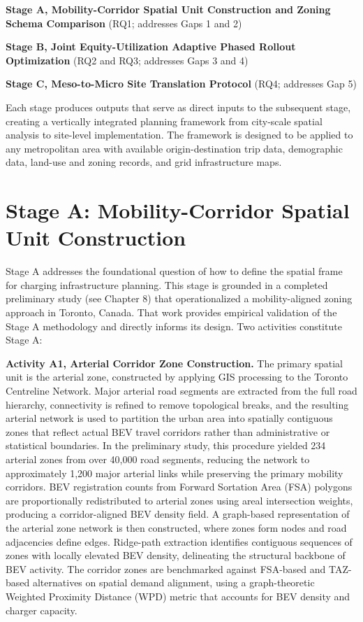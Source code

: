 \documentclass[letterpaper, 12pt, oneside, doublespacing]{Thesis}
\begin{document}
\noindent \textbf{Stage A, Mobility-Corridor Spatial Unit Construction and Zoning Schema Comparison} (RQ1; addresses Gaps 1 and 2)



\noindent \textbf{Stage B, Joint Equity-Utilization Adaptive Phased Rollout Optimization} (RQ2 and RQ3; addresses Gaps 3 and 4)



\noindent \textbf{Stage C, Meso-to-Micro Site Translation Protocol} (RQ4; addresses Gap 5)


Each stage produces outputs that serve as direct inputs to the subsequent stage, creating a vertically integrated planning framework from city-scale spatial analysis to site-level implementation. The framework is designed to be applied to any metropolitan area with available origin-destination trip data, demographic data, land-use and zoning records, and grid infrastructure maps.

\section{Stage A: Mobility-Corridor Spatial Unit Construction}

Stage A addresses the foundational question of how to define the spatial frame for charging infrastructure planning. This stage is grounded in a completed preliminary study (see Chapter 8) that operationalized a mobility-aligned zoning approach in Toronto, Canada. That work provides empirical validation of the Stage A methodology and directly informs its design. Two activities constitute Stage A:


\noindent \textbf{Activity A1, Arterial Corridor Zone Construction.} The primary spatial unit is the arterial zone, constructed by applying GIS processing to the Toronto Centreline Network. Major arterial road segments are extracted from the full road hierarchy, connectivity is refined to remove topological breaks, and the resulting arterial network is used to partition the urban area into spatially contiguous zones that reflect actual BEV travel corridors rather than administrative or statistical boundaries. In the preliminary study, this procedure yielded 234 arterial zones from over 40,000 road segments, reducing the network to approximately 1,200 major arterial links while preserving the primary mobility corridors. BEV registration counts from Forward Sortation Area (FSA) polygons are proportionally redistributed to arterial zones using areal intersection weights, producing a corridor-aligned BEV density field. A graph-based representation of the arterial zone network is then constructed, where zones form nodes and road adjacencies define edges. Ridge-path extraction identifies contiguous sequences of zones with locally elevated BEV density, delineating the structural backbone of BEV activity. The corridor zones are benchmarked against FSA-based and TAZ-based alternatives on spatial demand alignment, using a graph-theoretic Weighted Proximity Distance (WPD) metric that accounts for BEV density and charger capacity.
\end{document}
